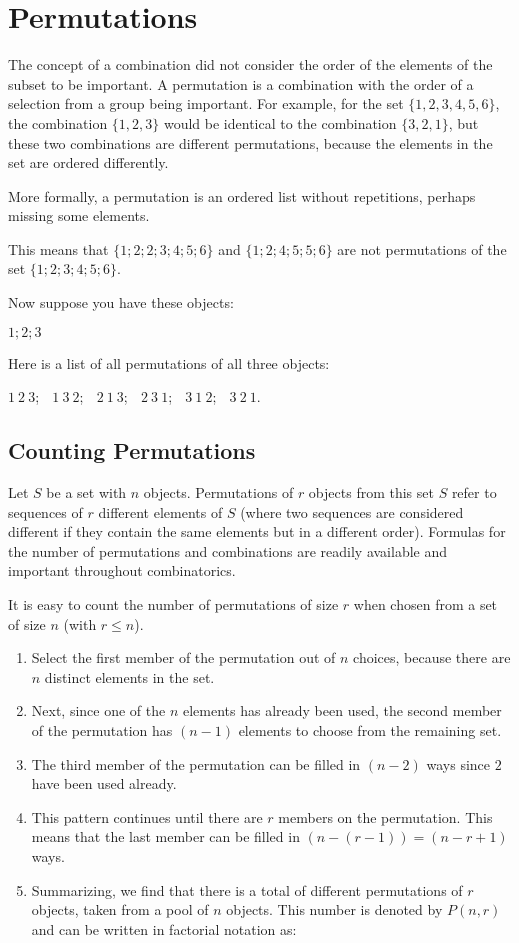 \section{Permutations}
The concept of a combination did not consider the order of the elements of the subset to be important. A permutation is a combination with the order of a selection from a group being important. For example, for the set $\{1, 2, 3, 4, 5, 6\}$, the combination $\{1, 2, 3\}$ would be identical to the combination $\{3, 2, 1\}$, but these two combinations are different permutations, because the elements in the set are ordered differently.

More formally, a permutation is an ordered list without repetitions, perhaps missing some elements.

This means that $\{1; 2; 2; 3; 4; 5; 6\}$ and $\{1; 2; 4; 5; 5; 6\}$ are not permutations of the set $\{1; 2; 3; 4; 5; 6\}$.

Now suppose you have these objects:

$1; 2; 3$

Here is a list of all permutations of all three objects:

$1~2~3$; $\;$
$1~3~2$; $\;$
$2~1~3$; $\;$
$2~3~1$; $\;$
$3~1~2$; $\;$
$3~2~1$. $\;$

\subsection{Counting Permutations}
Let $S$ be a set with $n$ objects. Permutations of $r$ objects from this set $S$ refer to sequences of $r$ different elements of $S$ (where two sequences are considered different if they contain the same elements but in a different order). Formulas for the number of permutations and combinations are readily available and important throughout combinatorics.

It is easy to count the number of permutations of size $r$ when chosen from a set of size $n$ (with $r \le n$).

\begin{enumerate}
\item{Select the first member of the permutation out of $n$ choices, because there are $n$ distinct elements in the set.}
\item{Next, since one of the $n$ elements has already been used, the second member of the permutation has $(n - 1)$ elements to choose from the remaining set.}
\item{The third member of the permutation can be filled in $(n - 2)$ ways since $2$ have been used already.}
\item{This pattern continues until there are $r$ members on the permutation. This means that the last member can be filled in $(n - (r - 1) ) = (n - r + 1)$ ways.}
\item{Summarizing, we find that there is a total of
different permutations of $r$ objects, taken from a pool of $n$ objects. This number is denoted by $P(n, r)$ and can be written in factorial notation as:
}
\end{enumerate}

